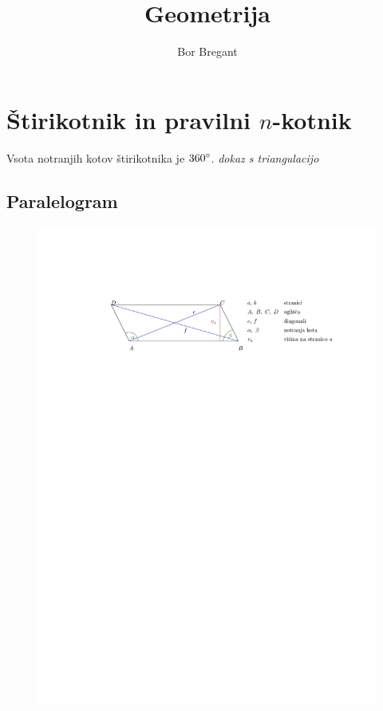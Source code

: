 \documentclass{article}
\title{Geometrija}
\author{Bor Bregant}
\date{\vspace{-5ex}}
\begin{document}
\maketitle

\section{Štirikotnik in pravilni $n$-kotnik}

Vsota notranjih kotov štirikotnika je $360\degree$. \textit{dokaz s triangulacijo}

\subsection*{Paralelogram}

\begin{figure}[H]
    \includegraphics[width=1\textwidth]{paralelogram.pdf}
    \centering
\end{figure}
\end{document}

